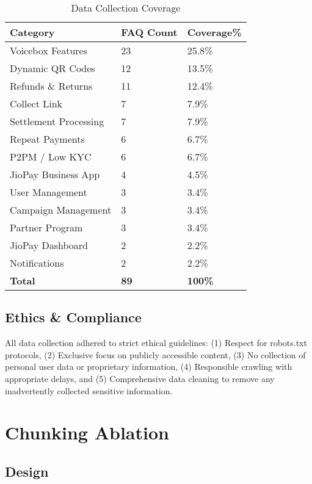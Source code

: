 \documentclass[11pt,a4paper]{article}
\begin{document}
\begin{table}[h!]
\centering
\caption{Data Collection Coverage}
\begin{tabular}{@{}lll@{}}
\toprule
\textbf{Category} & \textbf{FAQ Count} & \textbf{Coverage\%} \\
\midrule
Voicebox Features & 23 & 25.8\% \\
Dynamic QR Codes & 12 & 13.5\% \\
Refunds \& Returns & 11 & 12.4\% \\
Collect Link & 7 & 7.9\% \\
Settlement Processing & 7 & 7.9\% \\
Repeat Payments & 6 & 6.7\% \\
P2PM / Low KYC & 6 & 6.7\% \\
JioPay Business App & 4 & 4.5\% \\
User Management & 3 & 3.4\% \\
Campaign Management & 3 & 3.4\% \\
Partner Program & 3 & 3.4\% \\
JioPay Dashboard & 2 & 2.2\% \\
Notifications & 2 & 2.2\% \\
\midrule
\textbf{Total} & \textbf{89} & \textbf{100\%} \\
\bottomrule
\end{tabular}
\label{tab:coverage}
\end{table}

\subsection{Ethics \& Compliance}

All data collection adhered to strict ethical guidelines: (1) Respect for robots.txt protocols, (2) Exclusive focus on publicly accessible content, (3) No collection of personal user data or proprietary information, (4) Responsible crawling with appropriate delays, and (5) Comprehensive data cleaning to remove any inadvertently collected sensitive information.

\section{Chunking Ablation}

\subsection{Design}
\end{document}
